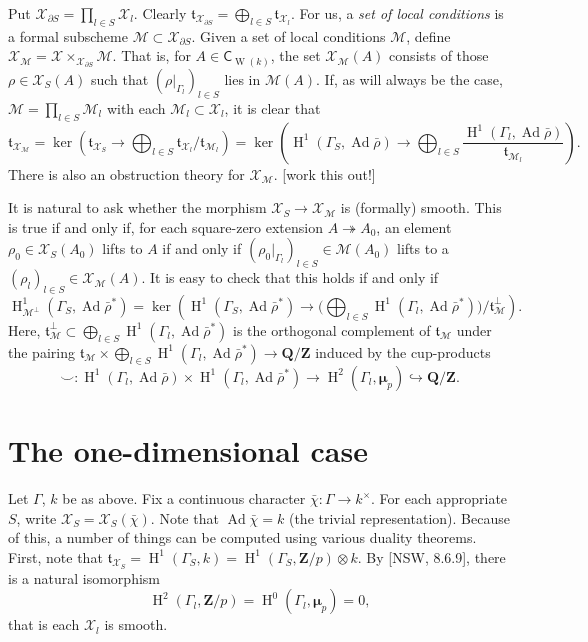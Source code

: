 \documentclass{article}
\DeclareMathOperator{\adjoint}{Ad}
\DeclareMathOperator{\h}{H}
\DeclareMathOperator{\witt}{W}
\newcommand{\cM}{\mathcal{M}}
\newcommand{\cX}{\mathcal{X}}
\newcommand{\dmu}{\bm\mu}
\newcommand{\dQ}{\mathbf{Q}}
\newcommand{\dZ}{\mathbf{Z}}
\newcommand{\ft}{\mathfrak{t}}
\newcommand{\coefficient}{\mathsf{C}}
\newcommand{\epic}{\twoheadrightarrow}
\newcommand{\monic}{\hookrightarrow}
\begin{document}
Put $\cX_{\partial S}=\prod_{l\in S} \cX_l$. Clearly 
$\ft_{\cX_{\partial S}} = \bigoplus_{l\in S} \ft_{\cX_l}$. For us, a 
\emph{set of local conditions} is a formal subscheme 
$\cM\subset \cX_{\partial S}$. Given a set of local conditions $\cM$, 
define $\cX_\cM=\cX\times_{\cX_{\partial S}} \cM$. That is, for 
$A\in\coefficient_{\witt(k)}$, the set $\cX_\cM(A)$ consists of those 
$\rho\in\cX_S(A)$ such that $(\rho|_{\Gamma_l})_{l\in S}$ lies in 
$\cM(A)$. If, as will always be the case, $\cM=\prod_{l\in S}\cM_l$ with each 
$\cM_l\subset \cX_l$, it is clear that 
\[
  \ft_{\cX_\cM} = \ker\left(\ft_{\cX_S}\to \bigoplus_{l\in S} \ft_{\cX_l}/\ft_{\cM_l}\right) = \ker\left(\h^1(\Gamma_S,\adjoint\bar\rho) \to \bigoplus_{l\in S} \frac{\h^1(\Gamma_l,\adjoint\bar\rho)}{\ft_{\cM_l}}\right) .
\]
There is also an obstruction theory for $\cX_\cM$. [work this out!]

It is natural to ask whether the morphism $\cX_S\to \cX_\cM$ is (formally) 
smooth. This is true if and only if, for each square-zero extension 
$A\epic A_0$, an element $\rho_0\in \cX_S(A_0)$ lifts to $A$ if and only if 
$(\rho_0|_{\Gamma_l})_{l\in S}\in \cM(A_0)$ lifts to a 
$(\rho_l)_{l\in S}\in \cX_\cM(A)$. It is easy to check that this holds if and 
only if 
\[
  \h^1_{\cM^\bot}(\Gamma_S,\adjoint\bar\rho^\ast) = \ker\left(\h^1(\Gamma_S,\adjoint\bar\rho^\ast) \to \bigg(\bigoplus_{l\in S} \h^1(\Gamma_l,\adjoint\bar\rho^\ast)\bigg) / \ft_\cM^\bot\right) .
\]
Here, $\ft_\cM^\bot\subset \bigoplus_{l\in S} \h^1(\Gamma_l,\adjoint\bar\rho^\ast)$ 
is the orthogonal complement of $\ft_\cM$ under the pairing 
$\ft_\cM\times \bigoplus_{l\in S} \h^1(\Gamma_l,\adjoint\bar\rho^\ast)\to \dQ/\dZ$ 
induced by the cup-products 
\[
  \smallsmile:\h^1(\Gamma_l,\adjoint\bar\rho)\times \h^1(\Gamma_l,\adjoint\bar\rho^\ast)\to \h^2(\Gamma_l,\dmu_p) \monic \dQ/\dZ .
\]





\section{The one-dimensional case}

Let $\Gamma$, $k$ be as above. Fix a continuous character 
$\bar\chi:\Gamma\to k^\times$. For each appropriate $S$, write 
$\cX_S=\cX_S(\bar\chi)$. Note that $\adjoint\bar\chi=k$ (the trivial 
representation). Because of this, a number of things can be computed using 
various duality theorems. First, note that 
$\ft_{\cX_S} = \h^1(\Gamma_S,k) = \h^1(\Gamma_S,\dZ/p)\otimes k$. By 
[NSW, 8.6.9], there is a natural isomorphism 
\[
  \h^2(\Gamma_l,\dZ/p) = \h^0(\Gamma_l,\dmu_p) = 0 ,
\]
that is each $\cX_l$ is smooth. 
\end{document}
